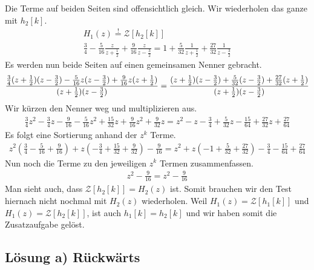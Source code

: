 \documentclass[11pt,a4paper,DIV=12]{scrartcl}
\begin{document}
%
%
Die Terme auf beiden Seiten sind offensichtlich gleich.
%
Wir wiederholen das ganze mit $h_2[k]$.
%
%
\begin{gather}
	H_1(z)\overset{!}{=}\mathcal{Z}\left[h_2[k]\right]\\
	\frac{3}{4}-\frac{5}{16}\frac{z}{z+\frac{1}{2}}+\frac{9}{16}\frac{z}{z-\frac{3}{2}}
	=1+\frac{5}{32}\frac{1}{z+\frac{1}{2}}+\frac{27}{32}\frac{1}{z-\frac{3}{2}}
\end{gather}
%
%
Es werden nun beide Seiten auf einen gemeinsamen Nenner gebracht.
%
%
\begin{gather}
	\frac{
		\frac{3}{4}(z+\frac{1}{2})(z-\frac{3}{2})-\frac{5}{16}z(z-\frac{3}{2})+\frac{9}{16}z(z+\frac{1}{2})
	}
	{
		(z+\frac{1}{2})(z-\frac{3}{2})
	}
	=\frac{
		(z+\frac{1}{2})(z-\frac{3}{2})+\frac{5}{32}(z-\frac{3}{2})+\frac{27}{32}(z+\frac{1}{2})
	}
	{
		(z+\frac{1}{2})(z-\frac{3}{2})
	}
\end{gather}
%
%
Wir kürzen den Nenner weg und multiplizieren aus.
%
%
\begin{gather}
	\frac{3}{4}z^2-\frac{3}{4}z-\frac{9}{16}-\frac{5}{16}z^2+\frac{15}{32}z+\frac{9}{16}z^2+\frac{9}{32}z
	=z^2-z-\frac{3}{4}+\frac{5}{32}z-\frac{15}{64}+\frac{27}{32}z+\frac{27}{64}
\end{gather}
%
%
Es folgt eine Sortierung anhand der $z^k$ Terme.
%
%
\begin{gather}
	z^2(\frac{3}{4}-\frac{5}{16}+\frac{9}{16})+z(-\frac{3}{4}+\frac{15}{32}+\frac{9}{32})-\frac{9}{16}
	=z^2+z(-1+\frac{5}{32}+\frac{27}{32})-\frac{3}{4}-\frac{15}{64}+\frac{27}{64}
\end{gather}
%
%
Nun noch die Terme zu den jeweiligen $z^k$ Termen zusammenfassen.
%
\begin{gather}
	z^2-\frac{9}{16}=z^2-\frac{9}{16}
\end{gather}
%
Man sieht auch, dass $\mathcal{Z}\left[h_2[k]\right]=H_2(z)$ ist.
%
Somit brauchen wir den Test hiernach nicht nochmal mit $H_2(z)$ wiederholen.
%
Weil $H_1(z)=\mathcal{Z}\left[h_1[k]\right]$ und
$H_1(z)=\mathcal{Z}\left[h_2[k]\right]$, ist auch $h_1[k]=h_2[k]$ und wir haben
somit die Zusatzaufgabe gelöst.\\
%
\newpage
\subsection{Lösung a) Rückwärts}
\end{document}
